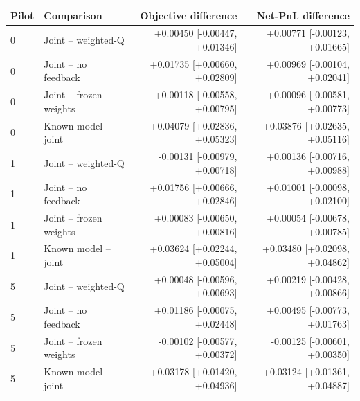 \begin{tabular}{llrr}\toprule
Pilot & Comparison & Objective difference & Net-PnL difference\\\midrule
0 & Joint -- weighted-Q & +0.00450 [-0.00447, +0.01346] & +0.00771 [-0.00123, +0.01665]\\
0 & Joint -- no feedback & +0.01735 [+0.00660, +0.02809] & +0.00969 [-0.00104, +0.02041]\\
0 & Joint -- frozen weights & +0.00118 [-0.00558, +0.00795] & +0.00096 [-0.00581, +0.00773]\\
0 & Known model -- joint & +0.04079 [+0.02836, +0.05323] & +0.03876 [+0.02635, +0.05116]\\
1 & Joint -- weighted-Q & -0.00131 [-0.00979, +0.00718] & +0.00136 [-0.00716, +0.00988]\\
1 & Joint -- no feedback & +0.01756 [+0.00666, +0.02846] & +0.01001 [-0.00098, +0.02100]\\
1 & Joint -- frozen weights & +0.00083 [-0.00650, +0.00816] & +0.00054 [-0.00678, +0.00785]\\
1 & Known model -- joint & +0.03624 [+0.02244, +0.05004] & +0.03480 [+0.02098, +0.04862]\\
5 & Joint -- weighted-Q & +0.00048 [-0.00596, +0.00693] & +0.00219 [-0.00428, +0.00866]\\
5 & Joint -- no feedback & +0.01186 [-0.00075, +0.02448] & +0.00495 [-0.00773, +0.01763]\\
5 & Joint -- frozen weights & -0.00102 [-0.00577, +0.00372] & -0.00125 [-0.00601, +0.00350]\\
5 & Known model -- joint & +0.03178 [+0.01420, +0.04936] & +0.03124 [+0.01361, +0.04887]\\
\bottomrule\end{tabular}
